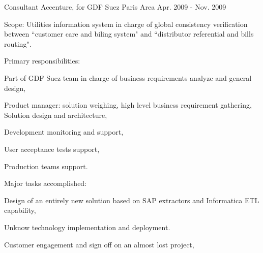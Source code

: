\begin{cventries}
  \cventry
    {Consultant} %
    {Accenture, for GDF Suez} %
    {Paris Area} %
    {Apr. 2009 - Nov. 2009} %
    {
      \begin{cvitems} %
        \item {Scope: Utilities information system in charge of global consistency verification between ``customer care and biling system" and ``distributor referential and bills routing".}
        \item {Primary responsibilities:}
        \begin{cvsubitems}
          \item {Part of GDF Suez team in charge of business requirements analyze and general design,}
          \item {Product manager: solution weighing, high level business requirement gathering, Solution design and architecture,}
          \item {Development monitoring and support,}
          \item {User acceptance tests support,}
          \item {Production teams support.}
        \end{cvsubitems}
        \item {Major tasks accomplished:}
        \begin{cvsubitems}
          \item {Design of an entirely new solution based on SAP extractors and Informatica ETL capability,}
          \item {Unknow technology implementation and deployment.}
          \item {Customer engagement and sign off on an almost lost project,}
        \end{cvsubitems}
      \end{cvitems}
    }


\end{cventries}
